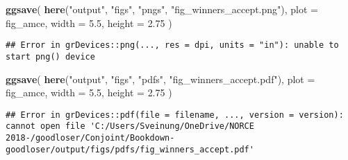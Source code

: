 \documentclass[]{book}
\newenvironment{Shaded}{\begin{snugshade}}{\end{snugshade}}
\newcommand{\KeywordTok}[1]{\textcolor[rgb]{0.13,0.29,0.53}{\textbf{#1}}}
\newcommand{\DataTypeTok}[1]{\textcolor[rgb]{0.13,0.29,0.53}{#1}}
\newcommand{\FloatTok}[1]{\textcolor[rgb]{0.00,0.00,0.81}{#1}}
\newcommand{\StringTok}[1]{\textcolor[rgb]{0.31,0.60,0.02}{#1}}
\newcommand{\NormalTok}[1]{#1}
\begin{document}
\begin{Shaded}
\begin{Highlighting}[]
\KeywordTok{ggsave}\NormalTok{(}
  \KeywordTok{here}\NormalTok{(}\StringTok{"output"}\NormalTok{, }\StringTok{"figs"}\NormalTok{, }\StringTok{"pngs"}\NormalTok{, }\StringTok{"fig_winners_accept.png"}\NormalTok{),}
  \DataTypeTok{plot =}\NormalTok{ fig_amce,}
  \DataTypeTok{width =} \FloatTok{5.5}\NormalTok{, }\DataTypeTok{height =} \FloatTok{2.75}
\NormalTok{)}
\end{Highlighting}
\end{Shaded}

\begin{verbatim}
## Error in grDevices::png(..., res = dpi, units = "in"): unable to start png() device
\end{verbatim}

\begin{Shaded}
\begin{Highlighting}[]
\KeywordTok{ggsave}\NormalTok{(}
  \KeywordTok{here}\NormalTok{(}\StringTok{"output"}\NormalTok{, }\StringTok{"figs"}\NormalTok{, }\StringTok{"pdfs"}\NormalTok{, }\StringTok{"fig_winners_accept.pdf"}\NormalTok{),}
  \DataTypeTok{plot =}\NormalTok{ fig_amce,}
  \DataTypeTok{width =} \FloatTok{5.5}\NormalTok{, }\DataTypeTok{height =} \FloatTok{2.75}
\NormalTok{)}
\end{Highlighting}
\end{Shaded}

\begin{verbatim}
## Error in grDevices::pdf(file = filename, ..., version = version): cannot open file 'C:/Users/Sveinung/OneDrive/NORCE 2018-/goodloser/Conjoint/Bookdown-goodloser/output/figs/pdfs/fig_winners_accept.pdf'
\end{verbatim}
\end{document}
